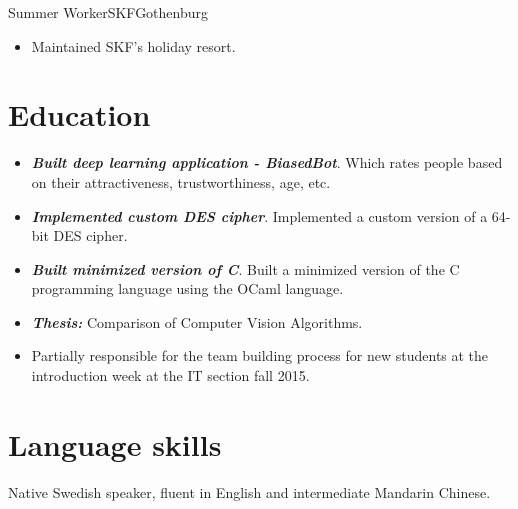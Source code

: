 \documentclass[11pt,a4paper,sans,colorlinks,linkcolor=blue,urlcolor=blue]{moderncv}
\begin{document}
{Summer Worker}{SKF}{Gothenburg}{}
{\begin{itemize}
    \itemsep0.3em
    \setlength{\itemindent}{.25in}
    \item Maintained SKF's holiday resort.
\end{itemize}}

\section{Education}

{\begin{itemize}
    \setlength{\itemindent}{.25in}
    \itemsep0.3em
    \item \textit{\textbf{Built deep learning application - BiasedBot}}. Which rates people based on their attractiveness, trustworthiness, age, etc.
\end{itemize}}{}

{\begin{itemize}
    \setlength{\itemindent}{.25in}
    \itemsep0.3em
    \item \textit{\textbf{Implemented custom DES cipher}}. Implemented a custom version of a 64-bit DES cipher.
    \item \textit{\textbf{Built minimized version of C}}. Built a minimized version of the C programming language using the OCaml language.
\end{itemize}}{}

{\begin{itemize}
    \setlength{\itemindent}{.25in}
    \itemsep0.3em
    \item \textit{\textbf{Thesis:}} Comparison of Computer Vision Algorithms.
    \item Partially responsible for the team building process for new students at the introduction week at the IT section fall 2015.
\end{itemize}}{}

\section{Language skills}
Native Swedish speaker, fluent in English and intermediate Mandarin Chinese.
\end{document}
